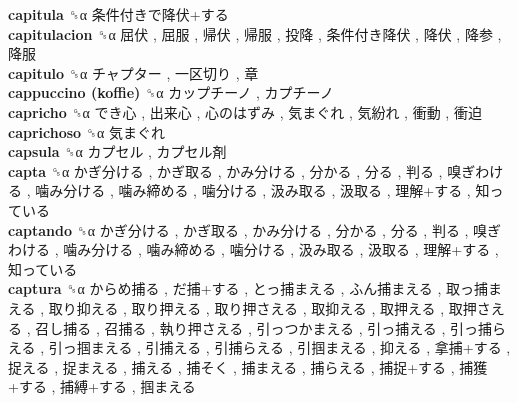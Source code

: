 \textbf{capitula} ␝α   条件付きで降伏+する   \\
\textbf{capitulacion} ␝α   屈伏 ,  屈服 ,  帰伏 ,  帰服 ,  投降 ,  条件付き降伏 ,  降伏 ,  降参 ,  降服   \\
\textbf{capitulo} ␝α   チャプター ,  一区切り ,  章   \\
\textbf{cappuccino (koffie)} ␝α   カップチーノ ,  カプチーノ   \\
\textbf{capricho} ␝α   でき心 ,  出来心 ,  心のはずみ ,  気まぐれ ,  気紛れ ,  衝動 ,  衝迫   \\
\textbf{caprichoso} ␝α   気まぐれ   \\
\textbf{capsula} ␝α   カプセル ,  カプセル剤   \\
\textbf{capta} ␝α   かぎ分ける ,  かぎ取る ,  かみ分ける ,  分かる ,  分る ,  判る ,  嗅ぎわける ,  噛み分ける ,  噛み締める ,  噛分ける ,  汲み取る ,  汲取る ,  理解+する ,  知っている   \\
\textbf{captando} ␝α   かぎ分ける ,  かぎ取る ,  かみ分ける ,  分かる ,  分る ,  判る ,  嗅ぎわける ,  噛み分ける ,  噛み締める ,  噛分ける ,  汲み取る ,  汲取る ,  理解+する ,  知っている   \\
\textbf{captura} ␝α   からめ捕る ,  だ捕+する ,  とっ捕まえる ,  ふん捕まえる ,  取っ捕まえる ,  取り抑える ,  取り押える ,  取り押さえる ,  取抑える ,  取押える ,  取押さえる ,  召し捕る ,  召捕る ,  執り押さえる ,  引っつかまえる ,  引っ捕える ,  引っ捕らえる ,  引っ掴まえる ,  引捕える ,  引捕らえる ,  引掴まえる ,  抑える ,  拿捕+する ,  捉える ,  捉まえる ,  捕える ,  捕そく ,  捕まえる ,  捕らえる ,  捕捉+する ,  捕獲+する ,  捕縛+する ,  掴まえる   \\
